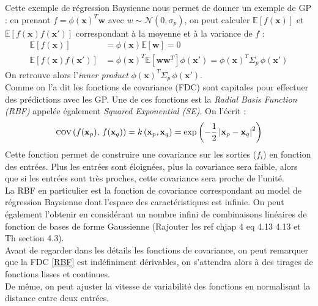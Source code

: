 \documentclass[a4paper,12pt]{report}
\newcommand{\bepar}[1]{
	\left( #1 \right)  
}
\numberwithin{equation}{section} %
\begin{document}
\noindent Cette exemple de régression Baysienne nous permet de donner un exemple de GP : en prenant $f = \phi(\textbf{x})^T\textbf{w}$ avec $w \sim \mathcal{N}\bepar{0, \sigma_p}$, on peut calculer $\mathbb{E}[f(\textbf{x})]$ et $\mathbb{E}[f(\textbf{x})f(\textbf{x}')]$ correspondant à la moyenne et à la variance de $f$ :
\begin{align*}
\mathbb{E}[f(\textbf{x})] & = \phi(\textbf{x})\mathbb{E}[\textbf{w}] = 0 \\
\mathbb{E}[f(\textbf{x})f(\textbf{x}')] & = \phi(\textbf{x})^T \mathbb{E}[\textbf{w}\textbf{w}^T]\phi(\textbf{x}') = \phi(\textbf{x})^T \Sigma_p \, \phi(\textbf{x}')
\end{align*}
On retrouve alors l'\textit{inner product} $\phi(\textbf{x})^T \Sigma_p \, \phi(\textbf{x}')$.\\
Comme on l'a dit les fonctions de covariance (FDC) sont capitales pour effectuer des prédictions avec les GP. Une de ces fonctions est la \textit{Radial Basis Function (RBF)} appelée également \textit{Squared Exponential (SE)}. On l'écrit :
\begin{equation}
 \textsc{cov}\bepar{f(\textbf{x}_p), \, f(\mathbf{x}_q)} = k\bepar{\textbf{x}_p, \textbf{x}_q} = \exp{\bepar{-\frac{1}{2}\left| \textbf{x}_p  - \textbf{x}_q\right|^2}}\label{RBF}
 \end{equation} 
Cette fonction permet de construire une covariance sur les sorties ($f_i$) en fonction des entrées. Plus les entrées sont éloignées, plus la covariance sera faible, alors que si les entrées sont très proches, cette covariance sera proche de l'unité.\\
La RBF en particulier est la fonction de covariance correspondant au model de régression Baysienne dont l'espace des caractéristiques est infinie. On peut également l'obtenir en considérant un nombre infini de combinaisons linéaires de fonction de bases de forme Gaussienne (Rajouter les ref chjap 4 eq 4.13 4.13 et Th section 4.3).\\
Avant de regarder dans les détails les fonctions de covariance, on peut remarquer que la FDC \eqref{RBF} est indéfiniment dérivables, on s'attendra alors à des tirages de fonctions lisses et continues.\\
De même, on peut ajuster la vitesse de variabilité des fonctions en normalisant la distance entre deux entrées.
\end{document}
